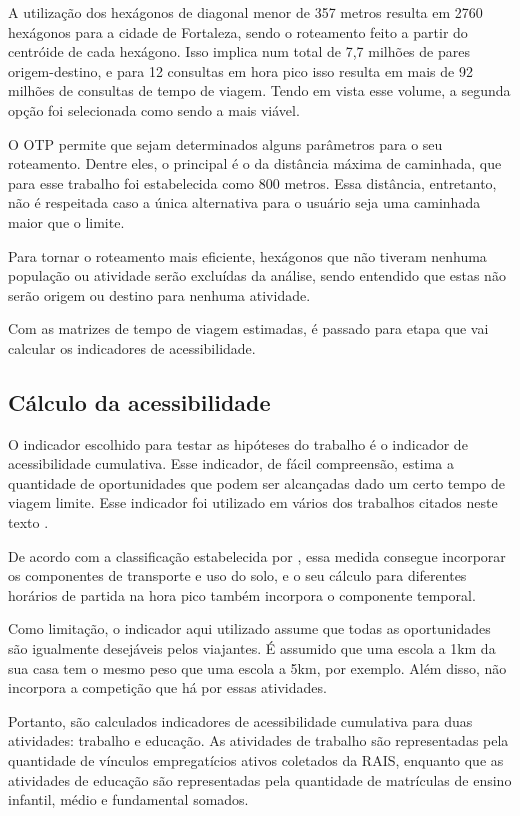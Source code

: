 \documentclass[        
    a4paper,          %
    12pt,             %
    chapter=TITLE,    %
    section=Title,    %
    subsection=Title, %
    oneside,          %
    english,          %
    spanish,          %
    brazil,           %
    fleqn             %
]{abntex2}
\begin{document}
  A utilização dos hexágonos de diagonal menor de 357 metros resulta em 2760 hexágonos para a cidade de Fortaleza, sendo o roteamento feito a partir do centróide de cada hexágono. Isso implica num total de 7,7 milhões de pares origem-destino, e para 12 consultas em hora pico isso resulta em mais de 92 milhões de consultas de tempo de viagem. Tendo em vista esse volume, a segunda opção foi selecionada como sendo a mais viável.
  
  O OTP permite que sejam determinados alguns parâmetros para o seu roteamento. Dentre eles, o principal é o da distância máxima de caminhada, que para esse trabalho foi estabelecida como 800 metros. Essa distância, entretanto, não é respeitada caso a única alternativa para o usuário seja uma caminhada maior que o limite.
  
  Para tornar o roteamento mais eficiente, hexágonos que não tiveram nenhuma população ou atividade serão excluídas da análise, sendo entendido que estas não serão origem ou destino para nenhuma atividade.
  
  Com as matrizes de tempo de viagem estimadas, é passado para etapa que vai calcular os indicadores de acessibilidade.
  
  \hypertarget{calculo-da-acessibilidade}{%
  \subsection{Cálculo da acessibilidade}\label{calculo-da-acessibilidade}}
  
  O indicador escolhido para testar as hipóteses do trabalho é o indicador de acessibilidade cumulativa. Esse indicador, de fácil compreensão, estima a quantidade de oportunidades que podem ser alcançadas dado um certo tempo de viagem limite. Esse indicador foi utilizado em vários dos trabalhos citados neste texto \citep{Wessel2017, Owen2015, Pereira2019}.
  
  De acordo com a classificação estabelecida por \citet{Geurs2004}, essa medida consegue incorporar os componentes de transporte e uso do solo, e o seu cálculo para diferentes horários de partida na hora pico também incorpora o componente temporal.
  
  Como limitação, o indicador aqui utilizado assume que todas as oportunidades são igualmente desejáveis pelos viajantes. É assumido que uma escola a 1km da sua casa tem o mesmo peso que uma escola a 5km, por exemplo. Além disso, não incorpora a competição que há por essas atividades.
  
  Portanto, são calculados indicadores de acessibilidade cumulativa para duas atividades: trabalho e educação. As atividades de trabalho são representadas pela quantidade de vínculos empregatícios ativos coletados da RAIS, enquanto que as atividades de educação são representadas pela quantidade de matrículas de ensino infantil, médio e fundamental somados.
  
\end{document}
